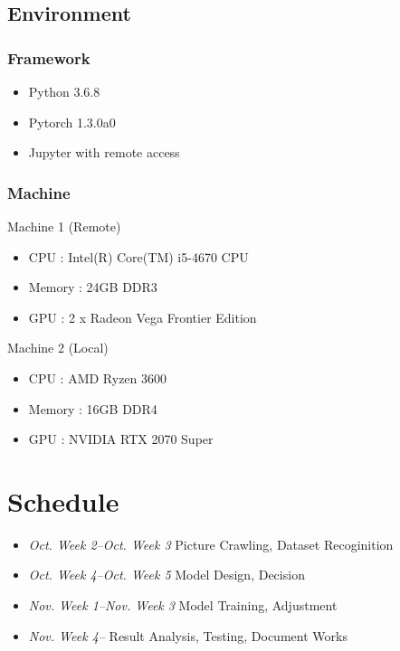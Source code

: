 \documentclass{article}
\begin{document}
\subsection{Environment}
\subsubsection{Framework}
\begin{itemize}
\item Python 3.6.8
\item Pytorch 1.3.0a0
\item Jupyter with remote access
\end{itemize}

\subsubsection{Machine}
Machine 1 (Remote)
\begin{itemize}
\item CPU : Intel(R) Core(TM) i5-4670 CPU
\item Memory : 24GB DDR3
\item GPU : 2 x Radeon Vega Frontier Edition
\end{itemize}

Machine 2 (Local)
\begin{itemize}
\item CPU : AMD Ryzen 3600
\item Memory : 16GB DDR4
\item GPU : NVIDIA RTX 2070 Super
\end{itemize}

\section{Schedule}
\begin{itemize}
\item \emph{Oct. Week 2--Oct. Week 3} \newline Picture Crawling, Dataset Recoginition
\item \emph{Oct. Week 4--Oct. Week 5} \newline Model Design, Decision
\item \emph{Nov. Week 1--Nov. Week 3} \newline Model Training, Adjustment
\item \emph{Nov. Week 4--} \newline Result Analysis, Testing, Document Works
\end{itemize}
\end{document}
